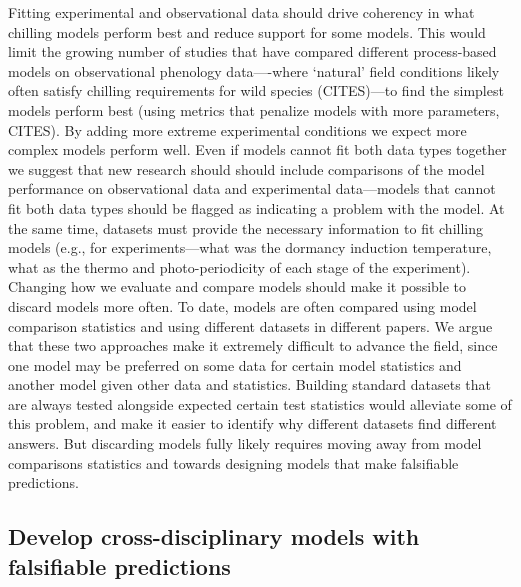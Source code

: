 \documentclass[11pt]{article}
\begin{document}
Fitting experimental and observational data should drive coherency in what chilling models perform best and reduce support for some models. This would limit the growing number of studies that have compared different process-based models on observational phenology data----where `natural' field conditions likely often satisfy chilling requirements for wild species (CITES)---to find the simplest models perform best (using metrics that penalize models with more parameters, CITES). By adding more extreme experimental conditions we expect more complex models perform well. Even if models cannot fit both data types together we suggest that new research should should include comparisons of the model performance on observational data and experimental data---models that cannot fit both data types should be flagged as indicating a problem with the model.  At the same time, datasets must provide the necessary information to fit chilling models (e.g., for experiments---what was the dormancy induction temperature, what as the thermo and photo-periodicity of each stage of the experiment). Changing how we evaluate and compare models should make it possible to discard models more often. To date, models are often compared using model comparison statistics and using different datasets in different papers. We argue that these two approaches make it extremely difficult to advance the field, since one model may be preferred on some data for certain model statistics and another model given other data and statistics. Building standard datasets that are always tested alongside expected certain test statistics would alleviate some of this problem, and make it easier to identify why different datasets find different answers. But discarding models fully likely requires moving away from model comparisons statistics and towards designing models that make falsifiable predictions.


\subsection*{Develop cross-disciplinary models with falsifiable predictions} 
\end{document}
